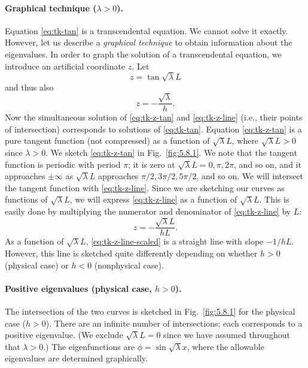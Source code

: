 \paragraph{Graphical technique ($\lambda > 0$).}
Equation \eqref{eq:tk-tan} is a transcendental equation.  We cannot solve it exactly.  However, let us describe a \textit{graphical technique} to obtain information about the eigenvalues.  In order to graph the solution of a transcendental equation, we introduce an artificial coordinate $z$.  Let
\begin{equation}
\label{eq:tk-z-tan}
z = \tan\sqrt{\lambda}L
\end{equation}
and thus also
\begin{equation}
\label{eq:tk-z-line}
z = -\frac{\sqrt{\lambda}}{h}.
\end{equation}
Now the simultaneous solution of \eqref{eq:tk-z-tan} and \eqref{eq:tk-z-line} (i.e., their points of intersection) corresponds to solutions of \eqref{eq:tk-tan}.  Equation \eqref{eq:tk-z-tan} is a pure tangent function (not compressed) as a function of $\sqrt{\lambda}L$, where $\sqrt{\lambda}L > 0$ since $\lambda > 0$.  We sketch \eqref{eq:tk-z-tan} in Fig.~\ref{fig:5.8.1}.  We note that the tangent function is periodic with period $\pi$; it is zero at $\sqrt{\lambda}L = 0, \pi, 2\pi$, and so on, and it approaches $\pm\infty$ as $\sqrt{\lambda}L$ approaches $\pi/2, 3\pi/2, 5\pi/2$, and so on.  We will intersect the tangent function with \eqref{eq:tk-z-line}.  Since we are sketching our curves as functions of $\sqrt{\lambda}L$, we will express \eqref{eq:tk-z-line} as a function of $\sqrt{\lambda}L$.  This is easily done by multiplying the numerator and denominator of \eqref{eq:tk-z-line} by $L$:
\begin{equation}
\label{eq:tk-z-line-scaled}
z = -\frac{\sqrt{\lambda}L}{hL}.
\end{equation}
As a function of $\sqrt{\lambda}L$, \eqref{eq:tk-z-line-scaled} is a straight line with slope $-1/hL$.  However, this line is sketched quite differently depending on whether $h > 0$ (physical case) or $h < 0$ (nonphysical case).

\paragraph{Positive eigenvalues (physical case, $h > 0$).}
The intersection of the two curves is sketched in Fig.~\ref{fig:5.8.1} for the physical case ($h > 0$).  There are an infinite number of intersections; each corresponds to a positive eigenvalue.  (We exclude $\sqrt{\lambda}L = 0$ since we have assumed throughout that $\lambda > 0$.)  The eigenfunctions are $\phi = \sin\sqrt{\lambda}x$, where the allowable eigenvalues are determined graphically.

